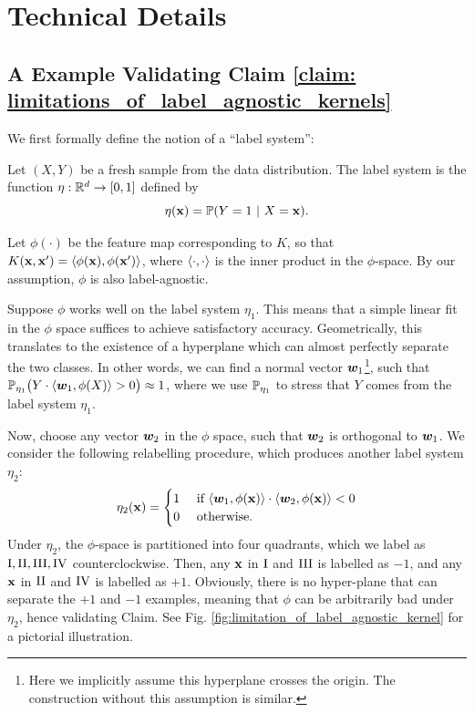 \newpage
\section{Technical Details} 
\label{append:proofs}

\subsection{A Example Validating Claim \ref{claim: limitations_of_label_agnostic_kernels}}\label{subappend:example_limit_of_label_agnostic_kernels}
We first formally define the notion of a ``label system'':
\begin{definition}
\label{def: label_system}
Let $(X, Y)$ be a fresh sample from the data distribution. The label system is the function $\eta: {\mathbb{R}}^d \to [0, 1]$ defined by
\[
\eta({\mathbf{x}}) = {\mathbb{P}}(Y = 1\ | \ X = {\mathbf{x}}).
\]
\end{definition}
Let $\phi(\cdot)$ be the feature map corresponding to $K$, so that $K({\mathbf{x}}, {\mathbf{x}}') = \langle \phi({\mathbf{x}}), \phi({\mathbf{x}}') \rangle$, where $\langle\cdot, \cdot\rangle$ is the inner product in the $\phi$-space. By our assumption, $\phi$ is also label-agnostic. 

Suppose $\phi$ works well on the label system $\eta_1$. This means that a simple linear fit in the $\phi$ space suffices to achieve satisfactory accuracy. Geometrically, this translates to the existence of a hyperplane which can almost perfectly separate the two classes. In other words, we can find a normal vector ${\boldsymbol{w}}_1$\footnote{Here we implicitly assume this hyperplane crosses the origin. The construction without this assumption is similar.}, such that ${\mathbb{P}}_{\eta_1}\bigl(Y \cdot \langle {\boldsymbol{w}}_1, \phi(X)\rangle > 0\bigr) \approx 1$, where we use ${\mathbb{P}}_{\eta_1}$ to stress that $Y$ comes from the label system $\eta_1$. 

Now, choose any vector ${\boldsymbol{w}}_2$ in the $\phi$ space, such that ${\boldsymbol{w}}_2$ is orthogonal to ${\boldsymbol{w}}_1$. We consider the following relabelling procedure, which produces another label system $\eta_2$:
\begin{equation}
	\label{eq: relabelling}
	\eta_2({\mathbf{x}}) = 
	\begin{cases}
		1 & \textnormal{ if } \langle {\boldsymbol{w}}_1, \phi({\mathbf{x}})\rangle \cdot \langle {\boldsymbol{w}}_2, \phi({\mathbf{x}})\rangle < 0\\
		0 & \textnormal{ otherwise}.
	\end{cases}
\end{equation}
Under $\eta_2$, the $\phi$-space is partitioned into four quadrants, which we label as $\RN{1}, \RN{2}, \RN{3}, \RN{4}$ counterclockwise. Then, any ${\mathbf{x}}$ in $\RN{1}$ and $\RN{3}$ is labelled as $-1$, and any ${\mathbf{x}}$ in $\RN{2}$ and $\RN{4}$ is labelled as $+1$. Obviously, there is no hyper-plane that can separate the $+1$ and $-1$ examples, meaning that $\phi$ can be arbitrarily bad under $\eta_2$, hence validating Claim. See Fig. \ref{fig:limitation_of_label_agnostic_kernel} for a pictorial illustration.

